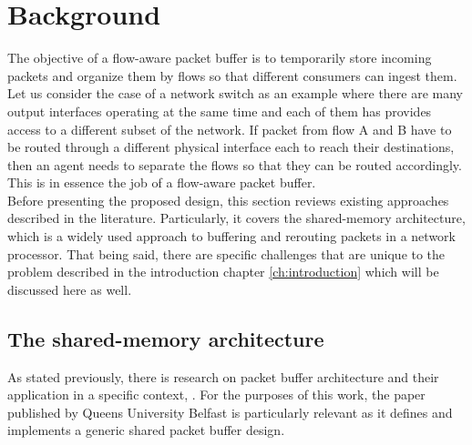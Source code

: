 \chapter{Background}\label{ch:background}
%

The objective of a flow-aware packet buffer is to temporarily store incoming packets and organize them by flows so that different consumers 
can ingest them. Let us consider the case of a network switch as an example where there are many output interfaces operating at the same time and 
each of them has provides access to a different subset of the network. If packet from flow A and B have to be routed through a different physical 
interface each to reach their destinations, then an agent needs to separate the flows so that they can be routed accordingly. This is in 
essence the job of a flow-aware packet buffer. \\

Before presenting the proposed design, this section reviews existing approaches described in the literature. 
Particularly, it covers the shared-memory architecture, which is a widely used approach to buffering 
and rerouting packets in a network processor. That being said, there are specific challenges that are unique 
to the problem described in the introduction chapter \ref{ch:introduction} which will 
be discussed here as well.

\section{The shared-memory architecture}
As stated previously, there is research on packet buffer architecture \cite{inproceedings} and their application 
in a specific context, \cite{lau2003gigabit} \cite{naous2008netfpga}. For the purposes of this work, the paper published 
by Queens University Belfast \cite{inproceedings} is particularly relevant as it defines and implements a generic shared 
packet buffer design. \\

